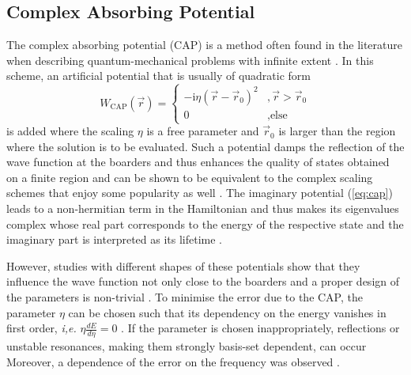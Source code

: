 \subsection{Complex Absorbing Potential}
\label{ch:cap}
The complex absorbing potential (CAP) is a method often found in the literature when describing quantum-mechanical problems with infinite extent \cite{bauch1, bauch2,capWork}.
In this scheme, an artificial potential that is usually of quadratic form
\begin{equation} \label{eq:cap}
   W_\text{CAP}(\vec{r})=\begin{cases} -\text{i}\eta(\vec{r}-\vec{r}_0)^2 & ,\vec{r}>\vec{r}_0 \\
                                           0    &, \text{else} \end{cases}
\end{equation}
is added where the scaling $\eta$ is a free parameter and $\vec{r}_0$ is larger than the region where the solution is to be evaluated.
Such a potential damps the reflection of the wave function at the boarders and thus enhances the quality of states obtained on a finite region \cite{cap1, cap2} and can be shown to be equivalent to the complex scaling schemes that enjoy some popularity as well \cite{compScale,cap2,capWork}.
The imaginary potential (\ref{eq:cap}) leads to a non-hermitian term in the Hamiltonian and thus makes its eigenvalues complex whose real part corresponds to the energy of the respective state and the imaginary part is interpreted as its lifetime \cite{compScale}.

However, studies with different shapes of these potentials show that they influence the wave function not only close to the boarders and a proper design of the parameters is non-trivial \cite{CAPfreshlook}.
To minimise the error due to the CAP, the parameter $\eta$ can be chosen such that its dependency on the energy vanishes in first order, \textit{i,e.} $\eta\frac{dE}{d\eta}=0$ \cite{CAPccEOM,CAPfreshlook}.
If the parameter is chosen inappropriately, reflections or unstable resonances, making them strongly basis-set dependent, can occur \cite{CAPfreshlook}
Moreover, a dependence of the error on the frequency was observed \cite{babuska}.

